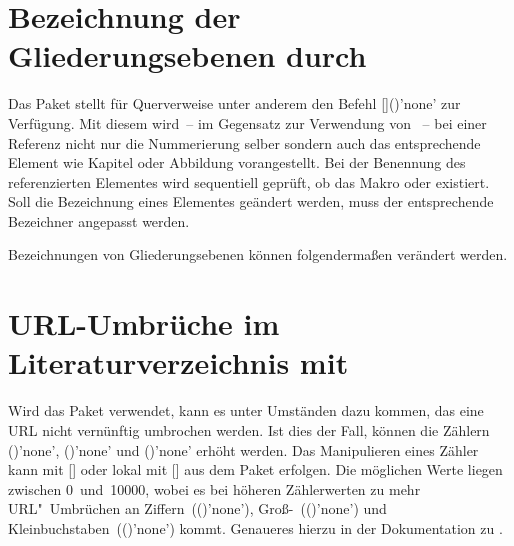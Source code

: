 \section{Bezeichnung der Gliederungsebenen durch }
%
%
Das Paket  stellt für Querverweise unter anderem den Befehl 
[]()'none' zur Verfügung. Mit 
diesem wird~-- im Gegensatz zur Verwendung von ~-- bei einer 
Referenz nicht nur die Nummerierung selber sondern auch das entsprechende 
Element wie Kapitel oder Abbildung vorangestellt. Bei der Benennung des 
referenzierten Elementes wird sequentiell geprüft, ob das Makro 
 oder 
 existiert. Soll die Bezeichnung eines 
Elementes geändert werden, muss der entsprechende Bezeichner angepasst werden.
%
\begin{Example}
Bezeichnungen von Gliederungsebenen können folgendermaßen verändert werden.
\begin{Code}
\end{Code}
\end{Example}



\section{URL-Umbrüche im Literaturverzeichnis mit }
%
%
Wird das Paket  verwendet, kann es unter Umständen dazu 
kommen, das eine URL nicht vernünftig umbrochen werden. Ist dies der Fall, 
können die Zählern ()'none', 
()'none' und 
()'none' erhöht werden. Das 
Manipulieren eines Zähler kann mit [] oder 
lokal mit [] aus dem Paket 
 erfolgen. Die möglichen Werte liegen zwischen 0~und~10000, 
wobei es bei höheren Zählerwerten zu mehr URL"~Umbrüchen an 
Ziffern~(()'none'), 
Groß-~(()'none') und 
Kleinbuchstaben~(()'none') kommt. 
Genaueres hierzu in der Dokumentation zu .



